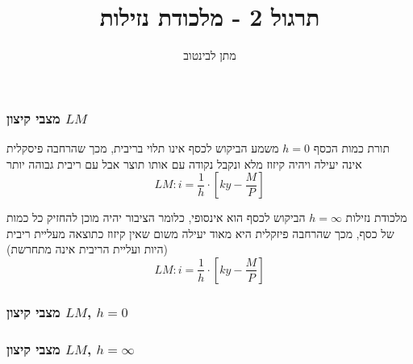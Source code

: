 \documentclass[usenames,dvipsnames]{beamer}
\title[מלכודת נזילות]{{תרגול 2 - מלכודת נזילות}}
\author{{ מתן לבינטוב}}
\institute[{{ אב"ג}}]{{ אוניברסיטת בן גוריון בנגב}}
\date{}
\begin{document}
\begin{RTL}
\begin{frame}
\titlepage
\end{frame}

\begin{frame}
    \frametitle{מצבי קיצון $LM$}
    \begin{block}{תורת כמות הכסף $h=0$}
        משמע הביקוש לכסף אינו תלוי בריבית, מכך שהרחבה פיסקלית אינה יעילה ויהיה קיזוז מלא ונקבל נקודה  עם אותו תוצר אבל עם ריבית גבוהה יותר
        $$LM : i = \frac{1}{h} \cdot \left[ky - \frac{M}{P}\right]$$
    \end{block}

    \begin{block}{מלכודת נזילות $h=\infty$}
        הביקוש לכסף הוא אינסופי, כלומר הציבור יהיה מוכן להחזיק כל כמות של כסף, מכך שהרחבה פיזקלית היא מאוד יעילה משום שאין קיזוז כתוצאה מעליית ריבית (היות ועליית הריבית אינה מתחרשת)
        $$LM : i = \frac{1}{h} \cdot \left[ky - \frac{M}{P}\right]$$   
    \end{block}
\end{frame}

\begin{frame}
    \frametitle{מצבי קיצון $LM$, $h=0$}

    \begin{center}
    \end{center}
\end{frame}

\begin{frame}
    \frametitle{מצבי קיצון $LM$, $h=\infty$}

    \begin{center}
\end{center}
\end{frame}
\end{RTL}
\end{document}

